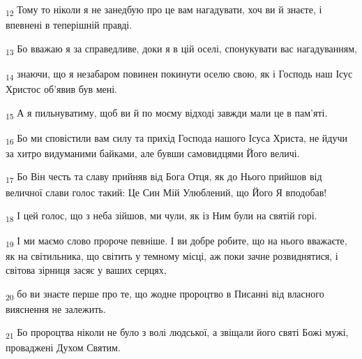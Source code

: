 \begin{tcolorbox}
\textsubscript{12} Тому то ніколи я не занедбую про це вам нагадувати, хоч ви й знаєте, і впевнені в теперішній правді.
\end{tcolorbox}
\begin{tcolorbox}
\textsubscript{13} Бо вважаю я за справедливе, доки я в цій оселі, спонукувати вас нагадуванням,
\end{tcolorbox}
\begin{tcolorbox}
\textsubscript{14} знаючи, що я незабаром повинен покинути оселю свою, як і Господь наш Ісус Христос об'явив був мені.
\end{tcolorbox}
\begin{tcolorbox}
\textsubscript{15} А я пильнуватиму, щоб ви й по моєму відході завжди мали це в пам'яті.
\end{tcolorbox}
\begin{tcolorbox}
\textsubscript{16} Бо ми сповістили вам силу та прихід Господа нашого Ісуса Христа, не йдучи за хитро видуманими байками, але бувши самовидцями Його величі.
\end{tcolorbox}
\begin{tcolorbox}
\textsubscript{17} Бо Він честь та славу прийняв від Бога Отця, як до Нього прийшов від величної слави голос такий: Це Син Мій Улюблений, що Його Я вподобав!
\end{tcolorbox}
\begin{tcolorbox}
\textsubscript{18} І цей голос, що з неба зійшов, ми чули, як із Ним були на святій горі.
\end{tcolorbox}
\begin{tcolorbox}
\textsubscript{19} І ми маємо слово пророче певніше. І ви добре робите, що на нього вважаєте, як на світильника, що світить у темному місці, аж поки зачне розвиднятися, і світова зірниця засяє у ваших серцях,
\end{tcolorbox}
\begin{tcolorbox}
\textsubscript{20} бо ви знаєте перше про те, що жодне пророцтво в Писанні від власного вияснення не залежить.
\end{tcolorbox}
\begin{tcolorbox}
\textsubscript{21} Бо пророцтва ніколи не було з волі людської, а звіщали його святі Божі мужі, проваджені Духом Святим.
\end{tcolorbox}
